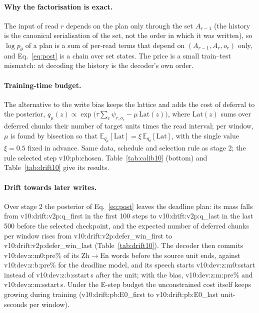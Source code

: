 \paragraph{Why the factorisation is exact.} The input of read $r$ depends on the plan only through the set $A_{r-1}$
(the history is the canonical serialisation of the set, not the order in which it was written), so
$\log p_\theta$ of a plan is a sum of per-read terms that depend on $(A_{r-1},A_r,o_r)$ only, and Eq.~\eqref{eq:post} is a
chain over set states. The price is a small train--test mismatch: at decoding the history is the decoder's own order.

\paragraph{Training-time budget.} The alternative to the write bias keeps the lattice and adds the cost of
deferral to the posterior, $q_\mu(z)\propto\exp\big(\tau\sum_r\psi_{r,o_r}-\mu\,\mathrm{Lat}(z)\big)$, where
$\mathrm{Lat}(z)$ sums over deferred chunks their number of target units times the read interval; per window, $\mu$ is
found by bisection so that $\mathbb{E}_{q_\mu}[\mathrm{Lat}]=\xi\,\mathbb{E}_{q_0}[\mathrm{Lat}]$, with the single value
$\xi=0.5$ fixed in advance. Same data, schedule and selection rule as stage 2; the rule selected step
\num{v10:pb:chosen}. Table~\ref{tab:calib10} (bottom) and Table~\ref{tab:drift10} give its results.



\paragraph{Drift towards later writes.} Over stage 2 the posterior of Eq.~\eqref{eq:post} leaves the deadline plan: its
mass falls from \num{v10:drift:v2p:q_first} in the first 100 steps to \num{v10:drift:v2p:q_last} in the last 500 before
the selected checkpoint, and the expected number of deferred chunks per window rises from
\num{v10:drift:v2p:defer_win_first} to \num{v10:drift:v2p:defer_win_last} (Table~\ref{tab:drift10}). The decoder then
commits \num{v10:dev:z:m0:pre}\% of its Zh$\rightarrow$En words before the source unit ends, against
\num{v10:dev:z:b:pre}\% for the deadline model, and its speech starts \num{v10:dev:z:m0:sstart} instead of
\num{v10:dev:z:b:sstart}\,s after the unit; with the bias, \num{v10:dev:z:m:pre}\% and \num{v10:dev:z:m:sstart}\,s.
Under the E-step budget the unconstrained cost itself keeps growing during training (\num{v10:drift:pb:E0_first} to
\num{v10:drift:pb:E0_last} unit-seconds per window).

